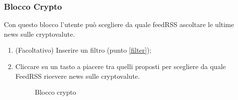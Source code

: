 \subsubsection{Blocco Crypto}
Con questo blocco l'utente può scegliere da quale feedRSS ascoltare le ultime news sulle cryptovalute.
\begin{enumerate}
	\item (Facoltativo) Inserire un filtro (punto \ref{filter});
	\item Cliccare su un tasto a piacere tra quelli proposti per scegliere da quale FeedRSS ricevere news sulle cryptovalute.
\begin{figure}[!ht]
	\centering
	\caption{Blocco crypto}
\end{figure}
\end{enumerate}
\newpage
